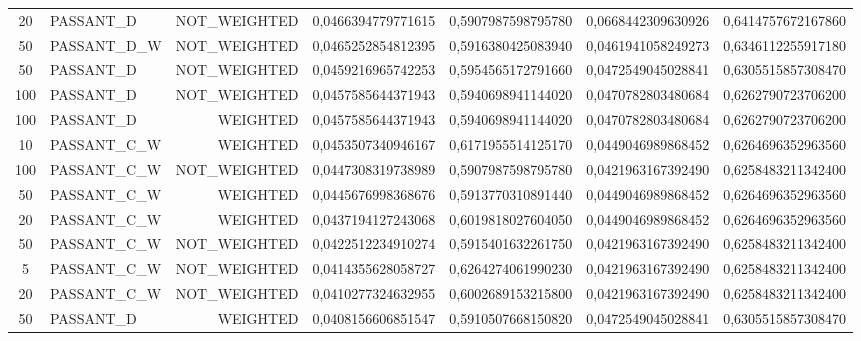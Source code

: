 \begin{table}[H]
{\begin{tabular}{ c l r c c c c }
				20 &  PASSANT\_D & NOT\_WEIGHTED & 0,0466394779771615 & 0,5907987598795780 & 0,0668442309630926 & 0,6414757672167860 \\
				
				50 & PASSANT\_D\_W & NOT\_WEIGHTED & 0,0465252854812395 & 0,5916380425083940 & 0,0461941058249273 & 0,6346112255917180 \\
				
				50 &  PASSANT\_D & NOT\_WEIGHTED & 0,0459216965742253 & 0,5954565172791660 & 0,0472549045028841 & 0,6305515857308470 \\
				
				100 &  PASSANT\_D & NOT\_WEIGHTED & 0,0457585644371943 & 0,5940698941144020 & 0,0470782803480684 & 0,6262790723706200 \\
				
				100 &  PASSANT\_D &   WEIGHTED & 0,0457585644371943 & 0,5940698941144020 & 0,0470782803480684 & 0,6262790723706200 \\
				
				10 & PASSANT\_C\_W &   WEIGHTED & 0,0453507340946167 & 0,6171955514125170 & 0,0449046989868452 & 0,6264696352963560 \\
				
				100 & PASSANT\_C\_W & NOT\_WEIGHTED & 0,0447308319738989 & 0,5907987598795780 & 0,0421963167392490 & 0,6258483211342400 \\
				
				50 & PASSANT\_C\_W &   WEIGHTED & 0,0445676998368676 & 0,5913770310891440 & 0,0449046989868452 & 0,6264696352963560 \\
				
				20 & PASSANT\_C\_W &   WEIGHTED & 0,0437194127243068 & 0,6019818027604050 & 0,0449046989868452 & 0,6264696352963560 \\
				
				50 & PASSANT\_C\_W & NOT\_WEIGHTED & 0,0422512234910274 & 0,5915401632261750 & 0,0421963167392490 & 0,6258483211342400 \\
				
				5 & PASSANT\_C\_W & NOT\_WEIGHTED & 0,0414355628058727 & 0,6264274061990230 & 0,0421963167392490 & 0,6258483211342400 \\
				
				20 & PASSANT\_C\_W & NOT\_WEIGHTED & 0,0410277324632955 & 0,6002689153215800 & 0,0421963167392490 & 0,6258483211342400 \\
				
				50 &  PASSANT\_D &   WEIGHTED & 0,0408156606851547 & 0,5910507668150820 & 0,0472549045028841 & 0,6305515857308470 \\
				

\end{tabular}}
\end{table}
